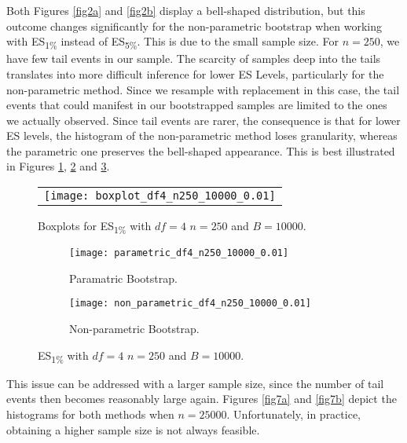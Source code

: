 \documentclass[11pt, a4paper]{article}
\begin{document}
Both Figures \ref{fig2a} and \ref{fig2b} display a bell-shaped distribution, but this outcome changes significantly for the non-parametric bootstrap when working with ES\textsubscript{1\%} instead of ES\textsubscript{5\%}. This is due to the small sample size. For $n=250$, we have few tail events in our sample. The scarcity of samples deep into the tails translates into more difficult inference for lower ES Levels, particularly for the non-parametric method. Since we resample with replacement in this case, the tail events that could manifest in our bootstrapped samples are limited to the ones we actually observed. Since tail events are rarer, the consequence is that for lower ES levels, the histogram of the non-parametric method loses granularity, whereas the parametric one preserves the bell-shaped appearance. This is best illustrated in Figures \ref{fig3}, \ref{fig4a} and \ref{fig4b}.\\


	\begin{figure}[!htb]\center 
		\begin{tabular}{c}
			\texttt{[image: boxplot\_df4\_n250\_10000\_0.01]}
		\end{tabular}
		\caption{\footnotesize Boxplots for ES\textsubscript{1\%} with $df=4$ $n=250$ and $B=10000$.}
		\label{fig3}
	\end{figure}

	\begin{figure}
		\centering 
		\begin{subfigure}{.4\linewidth}
			\centering
			\texttt{[image: parametric\_df4\_n250\_10000\_0.01]}
		\caption{\footnotesize Paramatric Bootstrap.}
		\label{fig4a}
		\end{subfigure} %
		\begin{subfigure}{.4\linewidth}
			\centering
			\texttt{[image: non\_parametric\_df4\_n250\_10000\_0.01]}
			\caption{\footnotesize Non-parametric Bootstrap.}
			\label{fig4b}
		\end{subfigure}
		\caption{\footnotesize ES\textsubscript{1\%} with $df=4$ $n=250$ and $B=10000$.}
		\label{fig4}
	\end{figure}

This issue can be addressed with a larger sample size, since the number of tail events then becomes reasonably large again. Figures \ref{fig7a} and \ref{fig7b} depict the histograms for both methods when $n=25000$. Unfortunately, in practice, obtaining a higher sample size is not always feasible.
\end{document}
